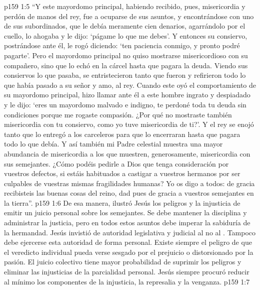 \vs p159 1:5 “Y este mayordomo principal, habiendo recibido, pues, misericordia y perdón de manos del rey, fue a ocuparse de sus asuntos, y encontrándose con uno de sus subordinados, que le debía meramente cien denarios, agarrándolo por el cuello, lo ahogaba y le dijo: ‘págame lo que me debes’. Y entonces su consiervo, postrándose ante él, le rogó diciendo: ‘ten paciencia conmigo, y pronto podré pagarte’. Pero el mayordomo principal no quiso mostrarse misericordioso con su compañero, sino que lo echó en la cárcel hasta que pagara la deuda. Viendo sus consiervos lo que pasaba, se entristecieron tanto que fueron y refirieron todo lo que había pasado a su señor y amo, al rey. Cuando este oyó el comportamiento de su mayordomo principal, hizo llamar ante él a este hombre ingrato y despiadado y le dijo: ‘eres un mayordomo malvado e indigno, te perdoné toda tu deuda sin condiciones porque me rogaste compasión. ¿Por qué no mostraste también misericordia con tu consiervo, como yo tuve misericordia de ti?’. Y el rey se enojó tanto que lo entregó a los carceleros para que lo encerraran hasta que pagara todo lo que debía. Y así también mi Padre celestial muestra una mayor abundancia de misericordia a los que muestren, generosamente, misericordia con sus semejantes. ¿Cómo podéis pedirle a Dios que tenga consideración por vuestros defectos, si estáis habituados a castigar a vuestros hermanos por ser culpables de vuestras mismas fragilidades humanas? Yo os digo a todos: de gracia recibisteis las buenas cosas del reino, dad pues de gracia a vuestros semejantes en la tierra”.
\vs p159 1:6 \pc De esa manera, ilustró Jesús los peligros y la injusticia de emitir un juicio personal sobre los semejantes. Se debe mantener la disciplina y administrar la justicia, pero en todos estos asuntos debe imperar la sabiduría de la hermandad. Jesús invistió de autoridad legislativa y judicial al  no al . Tampoco debe ejercerse esta autoridad de forma personal. Existe siempre el peligro de que el veredicto individual pueda verse sesgado por el prejuicio o distorsionado por la pasión. El juicio colectivo tiene mayor probabilidad de suprimir los peligros y eliminar las injusticias de la parcialidad personal. Jesús siempre procuró reducir al mínimo los componentes de la injusticia, la represalia y la venganza.
\vs p159 1:7 
